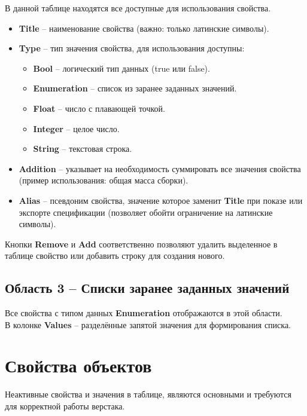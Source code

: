 \documentclass[a4paper,12pt]{article}
\begin{document}
В данной таблице находятся все доступные для использования свойства.
\begin{itemize}
	\item \textbf{Title} -- наименование свойства (важно: только латинские символы).
	\item \textbf{Type} -- тип значения свойства, для использования доступны:
	\begin{itemize}
		\item \textbf{Bool} -- логический тип данных (true или false).
		\item \textbf{Enumeration} -- список из заранее заданных значений.
		\item \textbf{Float} -- число с плавающей точкой.
		\item \textbf{Integer} -- целое число.
		\item \textbf{String} -- текстовая строка.
	\end{itemize}
	\item \textbf{Addition} -- указывает на необходимость суммировать все значения свойства\\(пример использования: общая масса сборки).
	\item \textbf{Alias} -- псевдоним свойства, значение которое заменит \textbf{Title} при показе или\\ экспорте спецификации (позволяет обойти ограничение на латинские символы).
\end{itemize}

\begin{flushleft}Кнопки \textbf{Remove} и \textbf{Add} соответственно позволяют удалить выделенное в таблице свойство или добавить строку для создания нового.\end{flushleft}

\subsection{Область 3 -- Списки заранее заданных значений}
Все свойства с типом данных \textbf{Enumeration} отображаются в этой области.\\В колонке \textbf{Values} -- разделённые запятой значения для формирования списка.





\section{Свойства объектов}

Неактивные свойства и значения в таблице, являются основными и требуются для корректной работы верстака.
\end{document}
